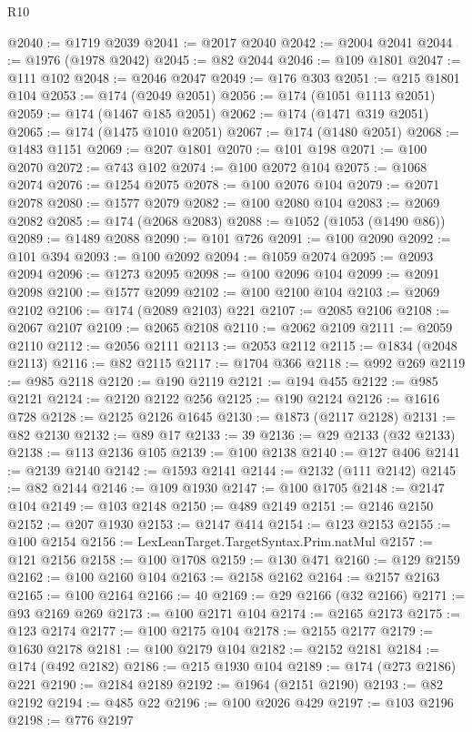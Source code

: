\begin{lexlean}{R10}
\begin{coremodule}
@2040 := @1719 @2039
@2041 := @2017 @2040
@2042 := @2004 @2041
@2044 := @1976 (@1978 @2042)
@2045 := @82 @2044
@2046 := @109 @1801
@2047 := @111 @102
@2048 := @2046 @2047
@2049 := @176 @303
@2051 := @215 @1801 @104
@2053 := @174 (@2049 @2051)
@2056 := @174 (@1051 @1113 @2051)
@2059 := @174 (@1467 @185 @2051)
@2062 := @174 (@1471 @319 @2051)
@2065 := @174 (@1475 @1010 @2051)
@2067 := @174 (@1480 @2051)
@2068 := @1483 @1151
@2069 := @207 @1801
@2070 := @101 @198
@2071 := @100 @2070
@2072 := @743 @102
@2074 := @100 @2072 @104
@2075 := @1068 @2074
@2076 := @1254 @2075
@2078 := @100 @2076 @104
@2079 := @2071 @2078
@2080 := @1577 @2079
@2082 := @100 @2080 @104
@2083 := @2069 @2082
@2085 := @174 (@2068 @2083)
@2088 := @1052 (@1053 (@1490 @86))
@2089 := @1489 @2088
@2090 := @101 @726
@2091 := @100 @2090
@2092 := @101 @394
@2093 := @100 @2092
@2094 := @1059 @2074
@2095 := @2093 @2094
@2096 := @1273 @2095
@2098 := @100 @2096 @104
@2099 := @2091 @2098
@2100 := @1577 @2099
@2102 := @100 @2100 @104
@2103 := @2069 @2102
@2106 := @174 (@2089 @2103) @221
@2107 := @2085 @2106
@2108 := @2067 @2107
@2109 := @2065 @2108
@2110 := @2062 @2109
@2111 := @2059 @2110
@2112 := @2056 @2111
@2113 := @2053 @2112
@2115 := @1834 (@2048 @2113)
@2116 := @82 @2115
@2117 := @1704 @366
@2118 := @992 @269
@2119 := @985 @2118
@2120 := @190 @2119
@2121 := @194 @455
@2122 := @985 @2121
@2124 := @2120 @2122 @256
@2125 := @190 @2124
@2126 := @1616 @728
@2128 := @2125 @2126 @1645
@2130 := @1873 (@2117 @2128)
@2131 := @82 @2130
@2132 := @89 @17
@2133 := 39
@2136 := @29 @2133 (@32 @2133)
@2138 := @113 @2136 @105
@2139 := @100 @2138
@2140 := @127 @406
@2141 := @2139 @2140
@2142 := @1593 @2141
@2144 := @2132 (@111 @2142)
@2145 := @82 @2144
@2146 := @109 @1930
@2147 := @100 @1705
@2148 := @2147 @104
@2149 := @103 @2148
@2150 := @489 @2149
@2151 := @2146 @2150
@2152 := @207 @1930
@2153 := @2147 @414
@2154 := @123 @2153
@2155 := @100 @2154
@2156 := LexLeanTarget.TargetSyntax.Prim.natMul
@2157 := @121 @2156
@2158 := @100 @1708
@2159 := @130 @471
@2160 := @129 @2159
@2162 := @100 @2160 @104
@2163 := @2158 @2162
@2164 := @2157 @2163
@2165 := @100 @2164
@2166 := 40
@2169 := @29 @2166 (@32 @2166)
@2171 := @93 @2169 @269
@2173 := @100 @2171 @104
@2174 := @2165 @2173
@2175 := @123 @2174
@2177 := @100 @2175 @104
@2178 := @2155 @2177
@2179 := @1630 @2178
@2181 := @100 @2179 @104
@2182 := @2152 @2181
@2184 := @174 (@492 @2182)
@2186 := @215 @1930 @104
@2189 := @174 (@273 @2186) @221
@2190 := @2184 @2189
@2192 := @1964 (@2151 @2190)
@2193 := @82 @2192
@2194 := @485 @22
@2196 := @100 @2026 @429
@2197 := @103 @2196
@2198 := @776 @2197

\end{coremodule}
\end{lexlean}
